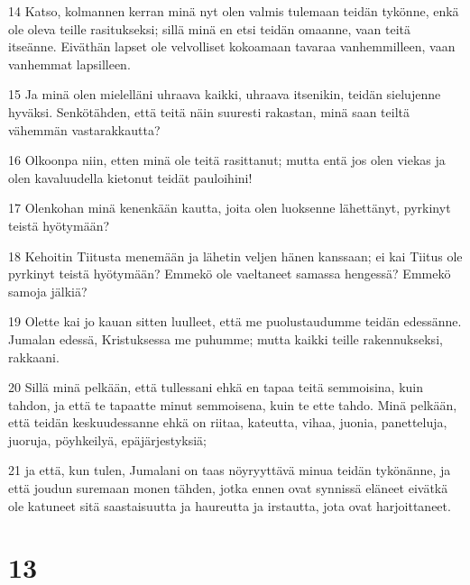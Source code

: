 \par 14 Katso, kolmannen kerran minä nyt olen valmis tulemaan teidän tykönne, enkä ole oleva teille rasitukseksi; sillä minä en etsi teidän omaanne, vaan teitä itseänne. Eiväthän lapset ole velvolliset kokoamaan tavaraa vanhemmilleen, vaan vanhemmat lapsilleen.
\par 15 Ja minä olen mielelläni uhraava kaikki, uhraava itsenikin, teidän sielujenne hyväksi. Senkötähden, että teitä näin suuresti rakastan, minä saan teiltä vähemmän vastarakkautta?
\par 16 Olkoonpa niin, etten minä ole teitä rasittanut; mutta entä jos olen viekas ja olen kavaluudella kietonut teidät pauloihini!
\par 17 Olenkohan minä kenenkään kautta, joita olen luoksenne lähettänyt, pyrkinyt teistä hyötymään?
\par 18 Kehoitin Tiitusta menemään ja lähetin veljen hänen kanssaan; ei kai Tiitus ole pyrkinyt teistä hyötymään? Emmekö ole vaeltaneet samassa hengessä? Emmekö samoja jälkiä?
\par 19 Olette kai jo kauan sitten luulleet, että me puolustaudumme teidän edessänne. Jumalan edessä, Kristuksessa me puhumme; mutta kaikki teille rakennukseksi, rakkaani.
\par 20 Sillä minä pelkään, että tullessani ehkä en tapaa teitä semmoisina, kuin tahdon, ja että te tapaatte minut semmoisena, kuin te ette tahdo. Minä pelkään, että teidän keskuudessanne ehkä on riitaa, kateutta, vihaa, juonia, panetteluja, juoruja, pöyhkeilyä, epäjärjestyksiä;
\par 21 ja että, kun tulen, Jumalani on taas nöyryyttävä minua teidän tykönänne, ja että joudun suremaan monen tähden, jotka ennen ovat synnissä eläneet eivätkä ole katuneet sitä saastaisuutta ja haureutta ja irstautta, jota ovat harjoittaneet.

\chapter{13}

